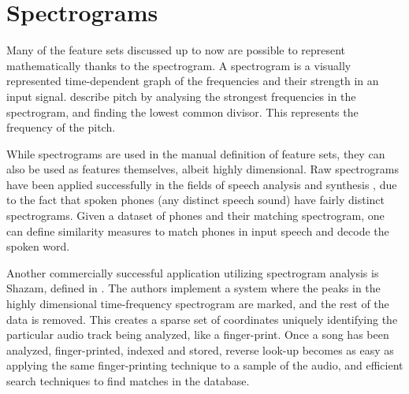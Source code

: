 \documentclass[12pt]{article}
\begin{document}
\section{Spectrograms}
Many of the feature sets discussed up to now are possible to represent mathematically thanks to the spectrogram. A spectrogram is a visually represented time-dependent graph of the frequencies and their strength in an input signal. \citet{Wold96} describe pitch by analysing the strongest frequencies in the spectrogram, and finding the lowest common divisor. This represents the frequency of the pitch. 

While spectrograms are used in the manual definition of feature sets, they can also be used as features themselves, albeit highly dimensional. Raw spectrograms have been applied successfully in the fields of speech analysis and synthesis \citep{flanagan2013speech}, due to the fact that spoken phones (any distinct speech sound) have fairly distinct spectrograms. Given a dataset of phones and their matching spectrogram, one can define similarity measures to match phones in input speech and decode the spoken word.

Another commercially successful application utilizing spectrogram analysis is Shazam, defined in \citet{Shazam03}. The authors implement a system where the peaks in the highly dimensional time-frequency spectrogram are marked, and the rest of the data is removed. This creates a sparse set of coordinates uniquely identifying the particular audio track being analyzed, like a finger-print. Once a song has been analyzed, finger-printed, indexed and stored, reverse look-up becomes as easy as applying the same finger-printing technique to a sample of the audio, and efficient search techniques to find matches in the database. 
\end{document}
